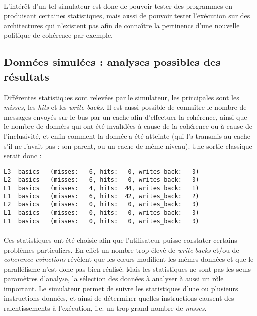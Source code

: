 \paragraph{}
L'intérêt d'un tel simulateur est donc de pouvoir tester des programmes en produisant certaines statistiques, mais aussi de pouvoir tester l'exécution sur des architectures qui n'existent pas afin de connaître la pertinence d'une nouvelle politique de cohérence par exemple.

\subsection{Données simulées : analyses possibles des résultats}

Différentes statistiques sont relevées par le simulateur, les principales sont les \emph{misses}, les \emph{hits} et les \emph{write-backs}. Il est aussi possible de connaître le nombre de messages envoyés sur le bus par un cache afin d'effectuer la cohérence, ainsi que le nombre de données qui ont été invalidées à cause de la cohérence ou à cause de l'inclusivité, et enfin comment la donnée a été atteinte (qui l'a transmis au cache s'il ne l'avait pas : son parent, ou un cache de même niveau). Une sortie classique serait donc :

\begin{lstlisting}
L3  basics   (misses:   6, hits:   0, writes_back:   0)
L2  basics   (misses:   6, hits:   0, writes_back:   0)
L1  basics   (misses:   4, hits:  44, writes_back:   1)
L1  basics   (misses:   6, hits:  42, writes_back:   2)
L2  basics   (misses:   0, hits:   0, writes_back:   0)
L1  basics   (misses:   0, hits:   0, writes_back:   0)
L1  basics   (misses:   0, hits:   0, writes_back:   0)
\end{lstlisting}

\paragraph{}
Ces statistiques ont été choisie afin que l'utilisateur puisse constater certains problèmes particuliers. En effet un nombre trop élevé de \emph{write-backs} et/ou de \emph{coherence evinctions} révèlent que les c\oe urs modifient les mêmes données et que le parallélisme n'est donc pas bien réalisé. Mais les statistiques ne sont pas les seuls paramètres d'analyse, la sélection des données à analyser à aussi un rôle important. Le simulateur permet de suivre les statistiques d'une ou plusieurs instructions données, et ainsi de déterminer quelles instructions causent des ralentissements à l'exécution, i.e. un trop grand nombre de \emph{misses}.

